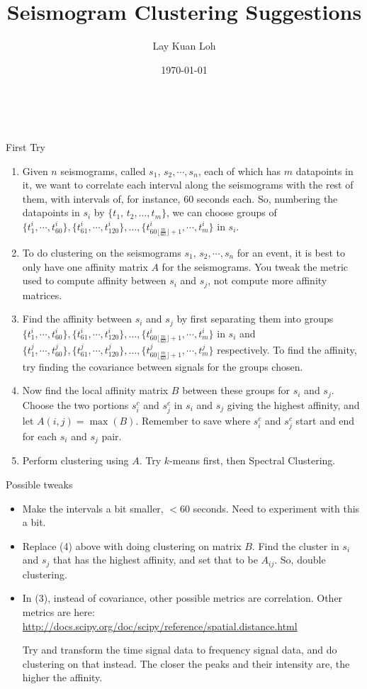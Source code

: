\documentclass[a4paper, 11pt]{article} %
\title{Seismogram Clustering Suggestions} %
\author{Lay Kuan Loh} %
\date{\today} %
\makeatletter
\renewcommand{\maketitle}{ %
\begin{flushright} %
{\LARGE\@title} %

\vspace{50pt} %

{\large\@author} %
\\\@date %

\vspace{40pt} %
\end{flushright}
}
\makeatother
\begin{document}
\maketitle %

First Try

\begin{enumerate}
 	\item Given $n$ seismograms, called $s_1,\,s_2,\cdots,s_n$, each of which has $m$ datapoints in it, we want to correlate each interval along the seismograms with the rest of them, with intervals of, for instance, 60 seconds each. So, numbering the datapoints in $s_i$ by $\{t_1,\,t_2,\ldots,t_m\}$, we can choose groups of $\{t^i_1,\cdots,t^i_{60}\},\{t^i_{61},\cdots,t^i_{120}\},\ldots,\{t^i_{60\lfloor\frac{m}{60}\rfloor+ 1},\cdots,t^i_m\}$ in $s_i$. 

	\item To do clustering on the seismograms $s_1,\,s_2,\cdots,s_n$ for an event, it is best to only have one affinity matrix $A$ for the seismograms. You tweak the metric used to compute affinity between $s_i$ and $s_j$, not compute more affinity matrices. 

	\item Find the affinity between $s_i$ and $s_j$ by first separating them into groups $\{t^i_1,\cdots,t^i_{60}\},\{t^i_{61},\cdots,t^i_{120}\},\ldots,\{t^i_{60\lfloor\frac{m}{60}\rfloor+ 1},\cdots,t^i_m\}$ in $s_i$ and $\{t^j_1,\cdots,t^j_{60}\},\{t^j_{61},\cdots,t^j_{120}\},\ldots,\{t^j_{60\lfloor\frac{m}{60}\rfloor+ 1},\cdots,t^j_m\}$ respectively. To find the affinity, try finding the covariance between signals for the groups chosen. 

	\item Now find the local affinity matrix $B$ between these groups for $s_i$ and $s_j$. Choose the two portions $s_i^c$ and $s_j^c$ in $s_i$ and $s_j$ giving the highest affinity, and let $A(i,j) = \max(B)$. Remember to save where $s_i^c$ and $s_j^c$ start and end for each $s_i$ and $s_j$ pair. 

	\item Perform clustering using $A$. Try $k$-means first, then Spectral Clustering.
\end{enumerate}

Possible tweaks
\begin{itemize}
    \item Make the intervals a bit smaller, $<60$ seconds. Need to experiment with this a bit.
    \item Replace (4) above with doing clustering on matrix $B$. Find the cluster in $s_i$ and $s_j$ that has the highest affinity, and set that to be $A_{ij}$. So, double clustering. 
    \item In (3), instead of covariance, other possible metrics are correlation. Other metrics are here: \url{http://docs.scipy.org/doc/scipy/reference/spatial.distance.html}

	Try and transform the time signal data to frequency signal data, and do clustering on that instead. The closer the peaks and their intensity are, the higher the affinity.
\end{itemize}






\end{document}

